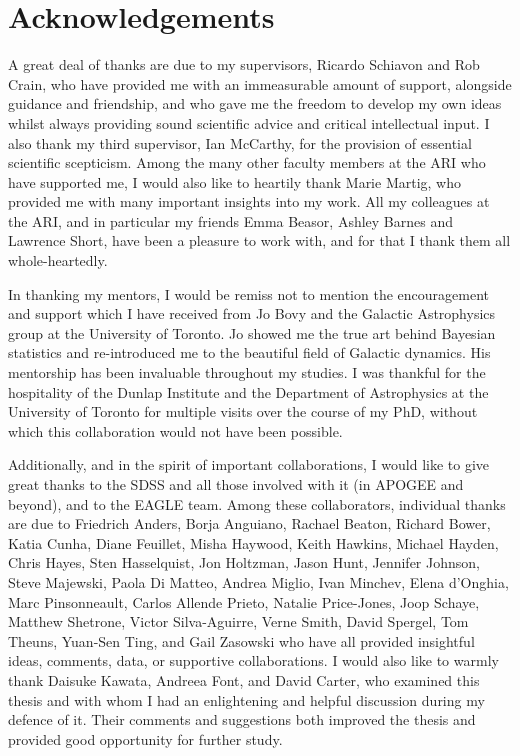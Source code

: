 \chapter*{Acknowledgements}

A great deal of thanks are due to my supervisors, Ricardo Schiavon and Rob Crain, who have provided me with an immeasurable amount of support, alongside guidance and friendship, and who gave me the freedom to develop my own ideas whilst always providing sound scientific advice and critical intellectual input. I also thank my third supervisor, Ian McCarthy, for the provision of essential scientific scepticism. Among the many other faculty members at the ARI who have supported me, I would also like to heartily thank Marie Martig, who provided me with many important insights into my work. All my colleagues at the ARI, and in particular my friends Emma Beasor, Ashley Barnes and Lawrence Short, have been a pleasure to work with, and for that I thank them all whole-heartedly. 

In thanking my mentors, I would be remiss not to mention the encouragement and support which I have received from Jo Bovy and the Galactic Astrophysics group at the University of Toronto. Jo showed me the true art behind Bayesian statistics and re-introduced me to the beautiful field of Galactic dynamics. His mentorship has been invaluable throughout my studies. I was thankful for the hospitality of the Dunlap Institute and the Department of Astrophysics at the University of Toronto for multiple visits over the course of my PhD, without which this collaboration would not have been possible. 

Additionally, and in the spirit of important collaborations, I would like to give great thanks to the SDSS and all those involved with it (in APOGEE and beyond), and to the EAGLE team. Among these collaborators, individual thanks are due to Friedrich Anders, Borja Anguiano, Rachael Beaton, Richard Bower, Katia Cunha, Diane Feuillet, Misha Haywood, Keith Hawkins, Michael Hayden, Chris Hayes, Sten Hasselquist, Jon Holtzman, Jason Hunt, Jennifer Johnson, Steve Majewski, Paola Di Matteo, Andrea Miglio, Ivan Minchev, Elena d'Onghia, Marc Pinsonneault, Carlos Allende Prieto, Natalie Price-Jones, Joop Schaye, Matthew Shetrone, Victor Silva-Aguirre, Verne Smith, David Spergel, Tom Theuns, Yuan-Sen Ting, and Gail Zasowski who have all provided insightful ideas, comments, data, or supportive collaborations. I would also like to warmly thank Daisuke Kawata, Andreea Font, and David Carter, who examined this thesis and with whom I had an enlightening and helpful discussion during my defence of it. Their comments and suggestions both improved the thesis and provided good opportunity for further study.


